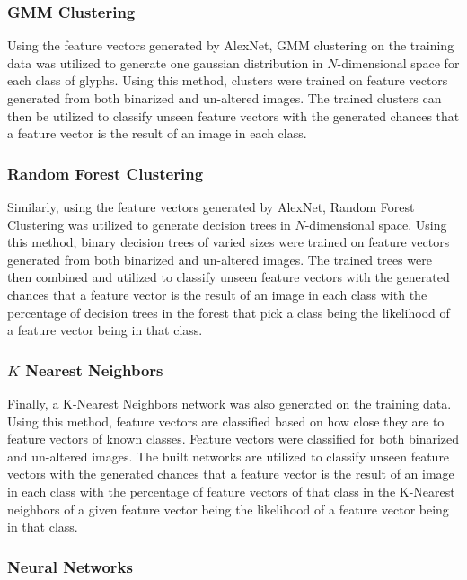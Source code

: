 \subsubsection{GMM Clustering}

Using the feature vectors generated by AlexNet, GMM clustering on the training data was utilized to generate one gaussian distribution in $N$-dimensional space for each class of glyphs. Using this method, clusters were trained on feature vectors generated from both binarized and un-altered images. The trained clusters can then be utilized to classify unseen feature vectors with the generated chances that a feature vector is the result of an image in each class.

\subsubsection{Random Forest Clustering}

Similarly, using the feature vectors generated by AlexNet, Random Forest Clustering was utilized to generate decision trees in $N$-dimensional space. Using this method, binary decision trees of varied sizes were trained on feature vectors generated from both binarized and un-altered images. The trained trees were then combined and utilized to classify unseen feature vectors with the generated chances that a feature vector is the result of an image in each class with the percentage of decision trees in the forest that pick a class being the likelihood of a feature vector being in that class.

\subsubsection{$K$ Nearest Neighbors}

Finally, a K-Nearest Neighbors network was also generated on the training data. Using this method, feature vectors are classified based on how close they are to feature vectors of known classes. Feature vectors were classified for both binarized and un-altered images. The built networks are utilized to classify unseen feature vectors with the generated chances that a feature vector is the result of an image in each class with the percentage of feature vectors of that class in the K-Nearest neighbors of a given feature vector being the likelihood of a feature vector being in that class.

\subsubsection{Neural Networks}

